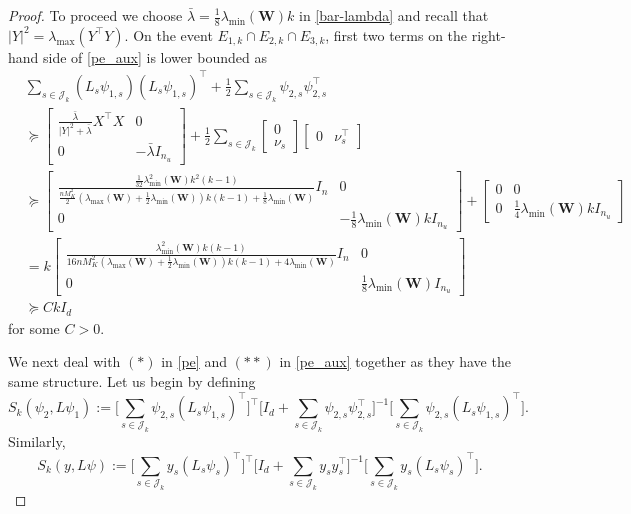 \documentclass[11pt]{article}
\theoremstyle{plain}
\theoremstyle{definition}
\theoremstyle{remark}
\begin{document}
\begin{proof}
To proceed we choose $\bar{\lambda} = \frac{1}{8}\lambda_{\min}(\mathbf{W})k$ in \eqref{bar-lambda} and recall that $|Y|^2 = \lambda _{\max} (Y^\top Y)$. On the event $E_{1,k} \cap E_{2,k} \cap E_{3,k}$, first two terms on the right-hand side of \eqref{pe_aux} is lower bounded as
\begin{align*}
    &\sum_{s \in\mathcal{J}_k}  (L_s\psi_{1,s})(L_s\psi_{1,s})^{\top}+\frac{1}{2}\sum_{s \in\mathcal{J}_k}  \psi_{2,s}\psi_{2,s}^{\top}\\
    &\succeq
    \begin{bmatrix}
    \frac{\bar\lambda}{|Y|^2+\bar\lambda}X^{\top}X & 0\\
    0 & -\bar\lambda I_{n_u}
    \end{bmatrix} + \frac{1}{2}
   \sum_{s\in\mathcal{J}_k} 
   \begin{bmatrix}0 \\ \nu_s  
   \end{bmatrix}
    \begin{bmatrix}
        0 &\nu_s^\top
    \end{bmatrix}\\
    &\succeq
    \begin{bmatrix}
    \frac{\frac{1}{32}\lambda_{\min}^2(\mathbf{W})k^2(k-1)}{\frac{nM_K^2}{2}(\lambda_{\max}(\mathbf{W})+\frac{1}{2}\lambda_{\min}(\mathbf{W}))k(k-1)+\frac{1}{8}\lambda_{\min}(\mathbf{W})} I_{n} &0\\ 
        0 & -\frac{1}{8}\lambda_{\min}(\mathbf{W}) k I_{n_u}
    \end{bmatrix}
    +
    \begin{bmatrix}
        0 & 0\\
        0 & \frac{1}{4}\lambda_{\min}(\mathbf{W})kI_{n_u}
    \end{bmatrix}
    \\
    &= 
    k\begin{bmatrix}
    \frac{\lambda_{\min}^2(\mathbf{W})k(k-1)}{16nM_K^2(\lambda_{\max}(\mathbf{W})+\frac{1}{2}\lambda_{\min}(\mathbf{W}))k(k-1)+4\lambda_{\min}(\mathbf{W})} I_{n}&0\\ 
        0 & \frac{1}{8}\lambda_{\min}(\mathbf{W})I_{n_u}
    \end{bmatrix}
    \\
    &\succeq C k I_{d}
\end{align*}
for some $C>0$. 

We next deal with $(*)$ in \eqref{pe} and $(**)$ in \eqref{pe_aux} together as they have the same  structure. Let us begin by defining 
\[
S_k(\psi_{2},L\psi_{1}) := \bigg[\sum_{s \in\mathcal{J}_k}  \psi_{2,s} (L_s \psi_{1,s})^{\top}\bigg]^{\top}\bigg[I_d+\sum_{s \in\mathcal{J}_k} \psi_{2,s}\psi_{2,s}^{\top}\bigg]^{-1}\bigg[\sum_{s \in\mathcal{J}_k}  \psi_{2,s} (L_s \psi_{1,s})^{\top}\bigg].
\]
Similarly,
\[
S_k(y,L\psi) := \bigg[\sum_{s \in\mathcal{J}_k}  y_s (L_s \psi_{s})^{\top}\bigg]^{\top}\bigg[I_d+\sum_{s \in\mathcal{J}_k} y_s y_s^{\top}\bigg]^{-1}\bigg[\sum_{s \in\mathcal{J}_k}  y_s (L_s \psi_{s})^{\top}\bigg].
\]


\end{proof}
\end{document}
